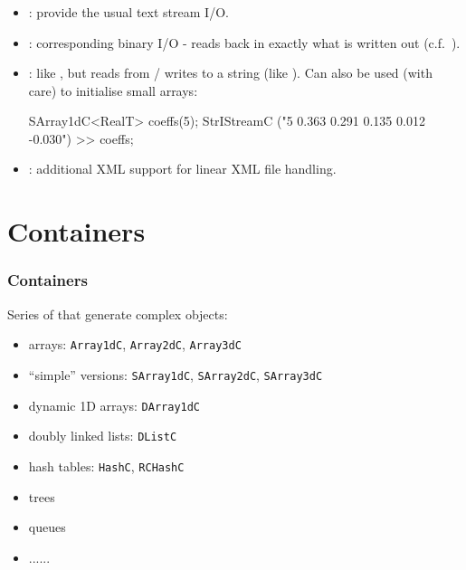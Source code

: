 \documentclass[landscape]{beamer}
\begin{document}
\begin{frame}[fragile]\frametitle{}

  \begin{itemize}
  \item {}: provide the usual text stream I/O.

  \pause\item {}: corresponding binary I/O - reads back in exactly what is written out (c.f.\ ).

  \pause\item {}: like , but reads from / writes to a string (like ).  Can also be used (with care) to initialise small arrays:

\begin{Code}
  SArray1dC<RealT> coeffs(5);
  StrIStreamC ("5 0.363 0.291 0.135 0.012 -0.030") >> coeffs;
\end{Code}

  \pause\item {}: additional XML support for linear XML file handling.
  \end{itemize}

\end{frame}


\section{Containers}


\begin{frame}[fragile]\frametitle{Containers}

Series of  that generate complex objects:

 \begin{itemize}
 \item arrays: {\tt Array1dC}, {\tt Array2dC}, {\tt Array3dC}
 \item {\color{grey}``simple'' versions: {\tt SArray1dC}, {\tt SArray2dC}, {\tt SArray3dC}}
 \item dynamic 1D arrays:  {\tt DArray1dC}
 \item doubly linked lists: {\tt DListC}
 \item hash tables: {\tt HashC}, {\tt RCHashC}
 \item trees
 \item queues
 \item ......
 \end{itemize}
\end{frame}
\end{document}
